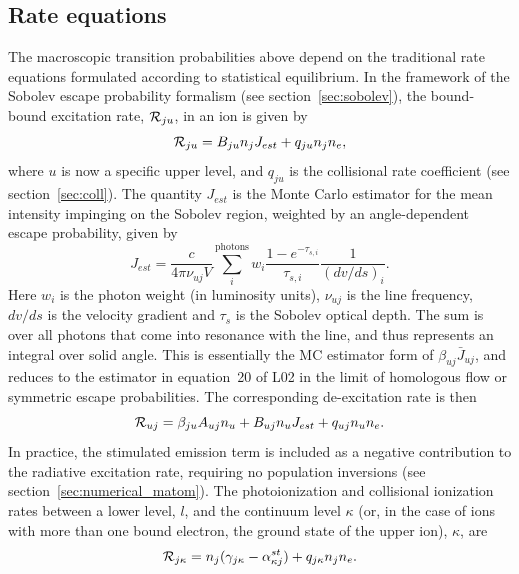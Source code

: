 \subsection{Rate equations}
\label{sec:rate_eq}
The macroscopic transition probabilities above depend on the traditional
rate equations formulated according to statistical equilibrium. 
In the framework of the Sobolev escape probability formalism 
(see section~\ref{sec:sobolev}), 
the bound-bound excitation rate, ${\cal R}_{ju}$, in an ion is given by 
\begin{equation}
{\cal R}_{ju} = B_{ju} n_j J_{est} + q_{ju} n_j n_e,
\label{eq:rad_rate}
\end{equation}
where $u$ is now a specific upper level, and $q_{ju}$ is the collisional
rate coefficient (see section~\ref{sec:coll}). The quantity
$J_{est}$ is the Monte Carlo estimator for the mean intensity 
impinging on the Sobolev region, weighted by an angle-dependent escape probability, 
given by \citep{sim2004}
\begin{equation}
J_{est} = \frac{c}{4 \pi \nu_{uj} V} \sum_{i}^{\mathrm{photons}} w_i \frac{1 - e^{-\tau_{s,i}}}{\tau_{s,i}} \frac{1}{(dv/ds)_i}.
\end{equation}
Here $w_i$ is the photon weight (in luminosity units), $\nu_{uj}$
is the line frequency, $dv/ds$ is the velocity gradient and
$\tau_s$ is the Sobolev optical depth.
The sum is over all photons that come into resonance with the line,
and thus represents an integral over solid angle.
This is essentially the MC estimator form of $\beta_{uj}\bar{J}_{uj}$, and
reduces to the estimator in equation~20 of L02 
in the limit of homologous flow or symmetric escape probabilities.
The corresponding de-excitation rate is then 
\begin{equation}
{\cal R}_{uj} = \beta_{ju} A_{uj} n_u + B_{uj} n_u J_{est} +
q_{uj} n_u n_e.
\label{eq:nlte_rul}
\end{equation}
In practice, the stimulated emission term is included as a negative contribution
to the radiative excitation rate, requiring no population inversions 
(see section~\ref{sec:numerical_matom}).
The photoionization and collisional ionization rates
between a lower level, $l$, and the continuum level $\kappa$ 
(or, in the case of ions with more than one bound electron, 
the ground state of the upper ion),
$\kappa$, are
\begin{equation}
{\cal R}_{j \kappa}= n_j (\gamma_{j\kappa} - \alpha^{st}_{\kappa j})  + q_{j \kappa} n_j n_e.
\end{equation}
